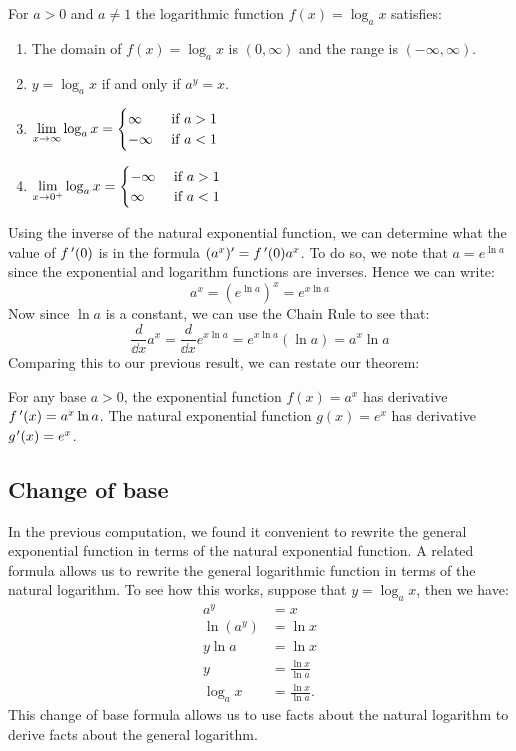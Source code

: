 \begin{keyidea}\label{ki_log_func_props}%
For $a>0$ and $a\ne1$ the logarithmic function $f(x)=\log_a x$ satisfies:
\begin{enumerate}
\item The domain of $f(x)=\log_a x$ is $(0,\infty)$ and the range is $(-\infty,\infty)$.
\item $y=\log_a x$ if and only if $a^y=x$.
\item $\displaystyle\lim_{x\to\infty}\log_a x=
\begin{cases}\infty&\text{ if $a>1$}\\ -\infty&\text{ if $a<1$}\end{cases}$
\item $\displaystyle\lim_{x\to0^+}\log_a x=\begin{cases}-\infty&\text{ if $a>1$}\\\infty&\text{ if $a<1$}\end{cases}$
\end{enumerate}
\end{keyidea}

Using the inverse of the natural exponential function, we can determine what the value of $f\,'(0)$ is in the formula $(a^x)'=f\,'(0)a^x$. To do so, we note that $a=e^{\ln a}$ since the exponential and logarithm functions are inverses. Hence we can write:
\[a^x=\left(e^{\ln a}\right)^x=e^{x\ln a}\]
Now since $\ln a$ is a constant, we can use the Chain Rule to see that:
\[\frac d{\dd x} a^x=\frac d{\dd x} e^{x\ln a} =e^{x\ln a}(\ln a) =a^x\ln a\]
Comparing this to our previous result, we can restate our theorem:

\begin{theorem}\label{thm_exp_deriv}%
For any base $a>0$, the exponential function $f(x)=a^x$ has derivative $f\,'(x)=a^x\ln a$. The natural exponential function $g(x)=e^x$ has derivative $g\primeskip'(x)=e^x$.
\end{theorem}

\subsection{Change of base}

In the previous computation, we found it convenient to rewrite the general exponential function in terms of the natural exponential function. A related formula allows us to rewrite the general logarithmic function in terms of the natural logarithm.  To see how this works, suppose that $y=\log_ax$, then we have:
\begin{align*}
a^y&=x \\
\ln(a^y)&=\ln x\\
y\ln a&=\ln x\\
y&=\frac{\ln x}{\ln a}\\
\log_a x&=\frac{\ln x}{\ln a}.
\end{align*}
This change of base formula allows us to use facts about the natural logarithm to derive facts about the general logarithm.


